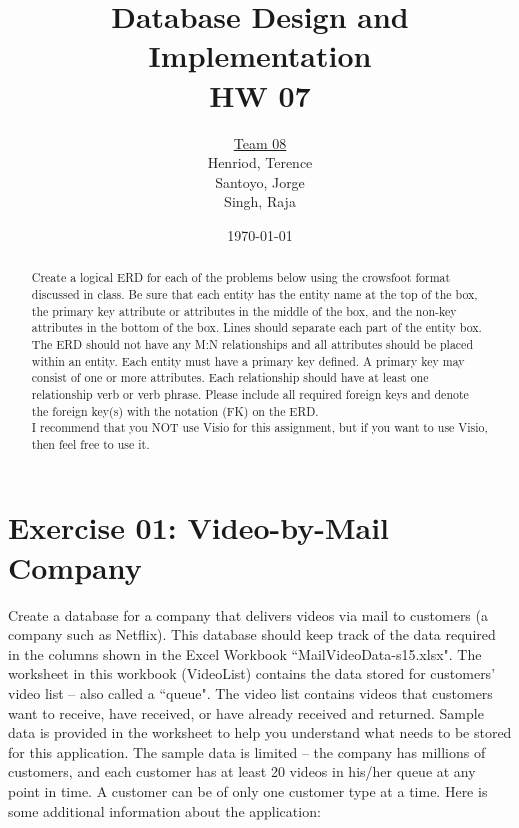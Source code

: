 \documentclass{article}
\title{Database Design and Implementation \\ HW 07}
\author{\underline{Team 08}\\Henriod, Terence\\Santoyo, Jorge \\Singh, Raja}
\date{\today}
\begin{document}
\clearpage
\maketitle
\thispagestyle{empty} %

\begin{abstract} %
Create a logical ERD for each of the problems below using the crowsfoot format discussed in class. Be sure that each entity has the entity name at the top of the box, the primary key attribute or attributes in the middle of the box, and the non-key attributes in the bottom of the box. Lines should separate each part of the entity box. The ERD should not have any M:N relationships and all attributes should be placed within an entity. Each entity must have a primary key defined. A primary key may consist of one or more attributes. Each relationship should have at least one relationship verb or verb phrase. Please include all required foreign keys and denote the foreign key(s) with the notation (FK) on the ERD. \\
I recommend that you NOT use Visio for this assignment, but if you want to use Visio, then feel free to use it.
\end{abstract}
%
%
\newpage
\section{Exercise 01: Video-by-Mail Company}

Create a database for a company that delivers videos via mail to customers (a company such as Netflix). This database should keep track of the data required in the columns shown in the Excel Workbook ``MailVideoData-s15.xlsx". The worksheet in this workbook (VideoList) contains the data stored for customers’ video list – also called a ``queue". The video list contains videos that customers want to receive, have received, or have already received and returned. Sample data is provided in the worksheet to help you understand what needs to be stored for this application. The sample data is limited – the company has millions of customers, and each customer has at least 20 videos in his/her queue at any point in time. A customer can be of only one customer type at a time. Here is some additional information about the application:
\end{document}
